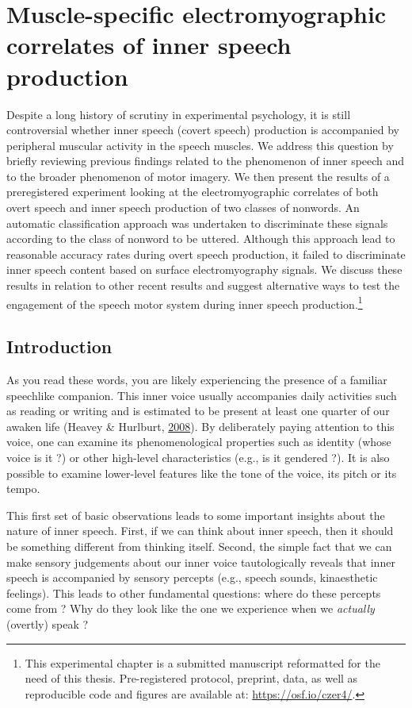 \documentclass[a4paper,12pt,twoside,openright,oldfontcommands,final]{memoir}
\let\rmarkdownfootnote\footnote%
\def\footnote{\protect\rmarkdownfootnote}
\newcommand{\initial}[1]{
	\lettrine[lines=3,lhang=0.33,nindent=0em]{
		\color{gray}
     		{\textsc{#1}}}{}}
\begin{document}
\hypertarget{chap5}{%
\chapter{Muscle-specific electromyographic correlates of inner speech production}\label{chap5}}

\initial{D}espite a long history of scrutiny in experimental psychology, it is still controversial whether inner speech (covert speech) production is accompanied by peripheral muscular activity in the speech muscles. We address this question by briefly reviewing previous findings related to the phenomenon of inner speech and to the broader phenomenon of motor imagery. We then present the results of a preregistered experiment looking at the electromyographic correlates of both overt speech and inner speech production of two classes of nonwords. An automatic classification approach was undertaken to discriminate these signals according to the class of nonword to be uttered. Although this approach lead to reasonable accuracy rates during overt speech production, it failed to discriminate inner speech content based on surface electromyography signals. We discuss these results in relation to other recent results and suggest alternative ways to test the engagement of the speech motor system during inner speech production.\footnote{This experimental chapter is a submitted manuscript reformatted for the need of this thesis. Pre-registered protocol, preprint, data, as well as reproducible code and figures are available at: \url{https://osf.io/czer4/}.}

\hypertarget{introduction-2}{%
\section{Introduction}\label{introduction-2}}

As you read these words, you are likely experiencing the presence of a familiar speechlike companion. This inner voice usually accompanies daily activities such as reading or writing and is estimated to be present at least one quarter of our awaken life (Heavey \& Hurlburt, \protect\hyperlink{ref-heavey_phenomena_2008}{2008}). By deliberately paying attention to this voice, one can examine its phenomenological properties such as identity (whose voice is it ?) or other high-level characteristics (e.g., is it gendered ?). It is also possible to examine lower-level features like the tone of the voice, its pitch or its tempo.

This first set of basic observations leads to some important insights about the nature of inner speech. First, if we can think about inner speech, then it should be something different from thinking itself. Second, the simple fact that we can make sensory judgements about our inner voice tautologically reveals that inner speech is accompanied by sensory percepts (e.g., speech sounds, kinaesthetic feelings). This leads to other fundamental questions: where do these percepts come from ? Why do they look like the one we experience when we \emph{actually} (overtly) speak ?
\end{document}
